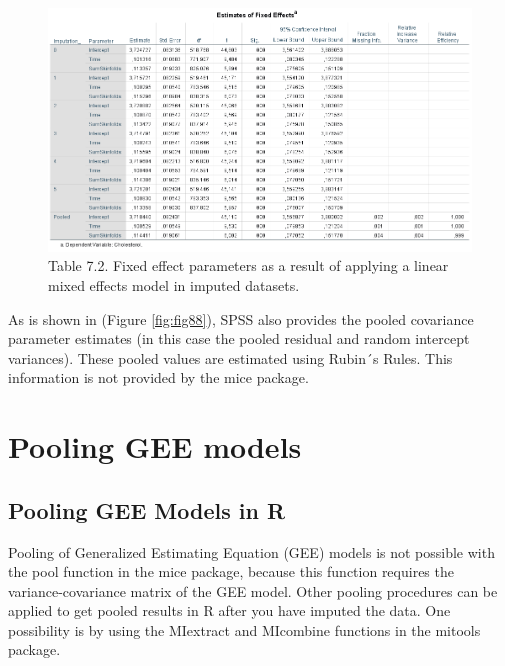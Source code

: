 \documentclass[]{book}
\begin{document}
\begin{figure}

{\centering \includegraphics[width=0.9\linewidth]{images/table7.3} 

}

\caption{Table 7.2. Fixed effect parameters as a result of applying a linear mixed effects model in imputed datasets.}\label{fig:fig89}
\end{figure}

As is shown in (Figure \ref{fig:fig88}), SPSS also provides the pooled
covariance parameter estimates (in this case the pooled residual and
random intercept variances). These pooled values are estimated using
Rubin´s Rules. This information is not provided by the mice package.

\section{Pooling GEE models}\label{pooling-gee-models}

\subsection{Pooling GEE Models in R}\label{pooling-gee-models-in-r}

Pooling of Generalized Estimating Equation (GEE) models is not possible
with the pool function in the mice package, because this function
requires the variance-covariance matrix of the GEE model. Other pooling
procedures can be applied to get pooled results in R after you have
imputed the data. One possibility is by using the MIextract and
MIcombine functions in the mitools package.
\end{document}
